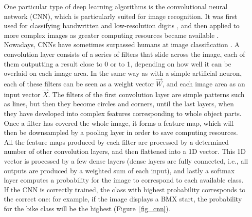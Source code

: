 One particular type of deep learning algorithms is the convolutional neural network (CNN), which is particularly suited for image recognition. It was first used for classifying handwritten and low-resolution digits \cite{LeCun1998}, and then applied to more complex images as greater computing resources became available \cite{Krizhevsky2017}. Nowadays, CNNs have sometimes surpassed humans at image classification \cite{Cireşan2012, Lu2015}. A convolution layer consists of a series of filters that slide across the image, each of them outputting a result close to 0 or to 1, depending on how well it can be overlaid on each image area. In the same way as with a simple artificial neuron, each of these filters can be seen as a weight vector \(\overrightarrow{W}\), and each image area as an input vector \(\overrightarrow{X}\). The filters of the first convolution layer are simple patterns such as lines, but then they become circles and corners, until the last layers, when they have developed into complex features corresponding to whole object parts. Once a filter has covered the whole image, it forms a feature map, which will then be downsampled by a pooling layer in order to save computing resources. All the feature maps produced by each filter are processed by a determined number of other convolution layers, and then flattened into a 1D vector. This 1D vector is processed by a few dense layers (dense layers are fully connected, i.e., all outputs are produced by a weighted sum of each input), and lastly a softmax layer computes a probability for the image to correspond to each available class. If the CNN is correctly trained, the class with highest probability corresponds to the correct one: for example, if the image displays a BMX start, the probability for the bike class will be the highest (Figure~\ref{fig_cnn}). 

